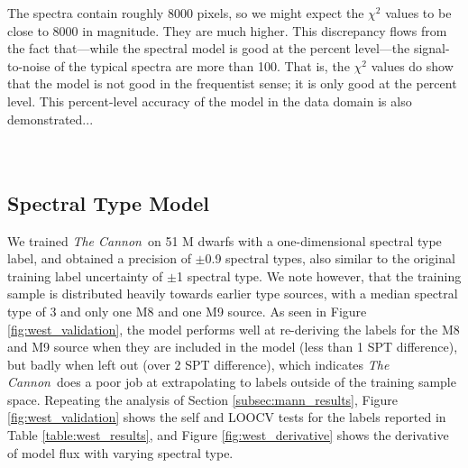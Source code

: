 \documentclass[modern]{aastex62}
\newcommand{\thecannon}{\textsl{The Cannon}}
\begin{document}
The spectra contain roughly 8000 pixels,
so we might expect the $\chi^2$ values to be close to 8000 in magnitude.
They are much higher.
This discrepancy flows from the fact that---while the spectral model is good at the percent
level---the signal-to-noise of the typical spectra are more than 100.
That is, the $\chi^2$ values do show that the model is not good in the frequentist
sense; it is only good at the percent level.
This percent-level accuracy of the model in the data domain is also demonstrated... \\

\color{gcolor}{BIRKY: Can you demonstrate this by showing the RMS residuals, putting it in as a figure, and putting this paragraph back to me? I am imagining a figure that shows a scatter plot of T vs RMS residual, colored by metallicity. Or something like that.}\color{black} \\

\color{gcolor}{HOGG: Adam's comment: if $\chi^2/n>>1$ then the model is NOT an accurate representation of the data.}\color{black} \\

\subsection{Spectral Type Model \label{subsec:west_results}}

We trained \thecannon\ on 51 M dwarfs with a one-dimensional spectral type label, and obtained a precision of $\pm$0.9 spectral types, also similar to the original training label uncertainty of $\pm$1 spectral type. We note however, that the training sample is distributed heavily towards earlier type sources, with a median spectral type of 3 and only one M8 and one M9 source. As seen in Figure \ref{fig:west_validation}, the model performs well at re-deriving the labels for the M8 and M9 source when they are included in the model (less than 1 SPT difference), but badly when left out (over 2 SPT difference), which indicates \thecannon\ does a poor job at extrapolating to labels outside of the training sample space. Repeating the analysis of Section \ref{subsec:mann_results}, Figure \ref{fig:west_validation} shows the self and LOOCV tests for the labels reported in Table \ref{table:west_results}, and Figure \ref{fig:west_derivative} shows the derivative of model flux with varying spectral type.
\end{document}
